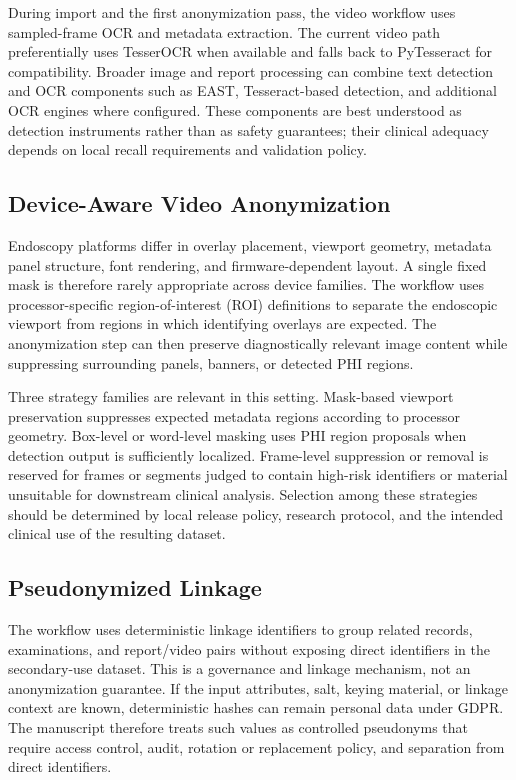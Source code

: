 \documentclass{article}
\begin{document}
During import and the first anonymization pass, the video workflow uses
sampled-frame OCR and metadata extraction. The current video path preferentially
uses TesserOCR when available and falls back to PyTesseract for compatibility.
\cite{tesserocr2018}\cite{smith2007overview} Broader image and report
processing can combine text detection and OCR components such as EAST,
Tesseract-based detection, and additional OCR engines where configured.
\cite{ZERONE2024}\cite{Ribeiro2019OCRcompare} These components are best
understood as detection instruments rather than as safety guarantees; their
clinical adequacy depends on local recall requirements and validation policy.

\subsection{Device-Aware Video Anonymization}
Endoscopy platforms differ in overlay placement, viewport geometry, metadata
panel structure, font rendering, and firmware-dependent layout. A single fixed
mask is therefore rarely appropriate across device families. The workflow uses
processor-specific region-of-interest (ROI) definitions to separate the
endoscopic viewport from regions in which identifying overlays are expected.
The anonymization step can then preserve diagnostically relevant image content
while suppressing surrounding panels, banners, or detected PHI regions.

Three strategy families are relevant in this setting. Mask-based viewport
preservation suppresses expected metadata regions according to processor
geometry. Box-level or word-level masking uses PHI region proposals when
detection output is sufficiently localized. Frame-level suppression or removal
is reserved for frames or segments judged to contain high-risk identifiers or
material unsuitable for downstream clinical analysis. Selection among these
strategies should be determined by local release policy, research protocol, and
the intended clinical use of the resulting dataset.

\subsection{Pseudonymized Linkage}
The workflow uses deterministic linkage identifiers to group related records,
examinations, and report/video pairs without exposing direct identifiers in the
secondary-use dataset. This is a governance and linkage mechanism, not an
anonymization guarantee. If the input attributes, salt, keying material, or
linkage context are known, deterministic hashes can remain personal data under
GDPR. The manuscript therefore treats such values as controlled pseudonyms that
require access control, audit, rotation or replacement policy, and separation
from direct identifiers.
\end{document}
